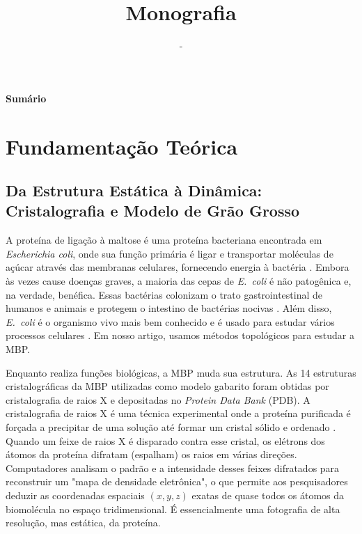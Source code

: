 \documentclass[12pt, a4paper]{article}
\title{Monografia}
\author{-}
\makeatletter
\renewcommand{\contentsname}{Sumário}
\renewcommand\tableofcontents{
  \null\hfill\textbf{\Large\contentsname}\hfill\null\par
  \@mkboth{\MakeUppercase\contentsname}{\MakeUppercase\contentsname}
  \@starttoc{toc}
}
\makeatother
\begin{document}
\tableofcontents
\newpage

\maketitle
\section{Fundamentação Teórica}

\subsection{Da Estrutura Estática à Dinâmica: Cristalografia e Modelo de Grão Grosso}
\label{sec:grao_grosso}

A proteína de ligação à maltose é uma proteína bacteriana encontrada em \textit{Escherichia coli}, onde sua função primária é ligar e transportar moléculas de açúcar através das membranas celulares, fornecendo energia à bactéria \cite{Boos1998}. Embora às vezes cause doenças graves, a maioria das cepas de \textit{E.\ coli} é não patogênica e, na verdade, benéfica. Essas bactérias colonizam o trato gastrointestinal de humanos e animais e protegem o intestino de bactérias nocivas \cite{Hudault2001}. Além disso, \textit{E.\ coli} é o organismo vivo mais bem conhecido e é usado para estudar vários processos celulares \cite{VanHoudt2005}. Em nosso artigo, usamos métodos topológicos para estudar a MBP.

Enquanto realiza funções biológicas, a MBP muda sua estrutura. As 14 estruturas cristalográficas da MBP utilizadas como modelo gabarito foram obtidas por cristalografia de raios X e depositadas no \textit{Protein Data Bank} (PDB). A cristalografia de raios X é uma técnica experimental onde a proteína purificada é forçada a precipitar de uma solução até formar um cristal sólido e ordenado \cite{spurlino1991}. Quando um feixe de raios X é disparado contra esse cristal, os elétrons dos átomos da proteína difratam (espalham) os raios em várias direções. Computadores analisam o padrão e a intensidade desses feixes difratados para reconstruir um "mapa de densidade eletrônica", o que permite aos pesquisadores deduzir as coordenadas espaciais $(x,y,z)$ exatas de quase todos os átomos da biomolécula no espaço tridimensional. É essencialmente uma fotografia de alta resolução, mas estática, da proteína.
\end{document}
